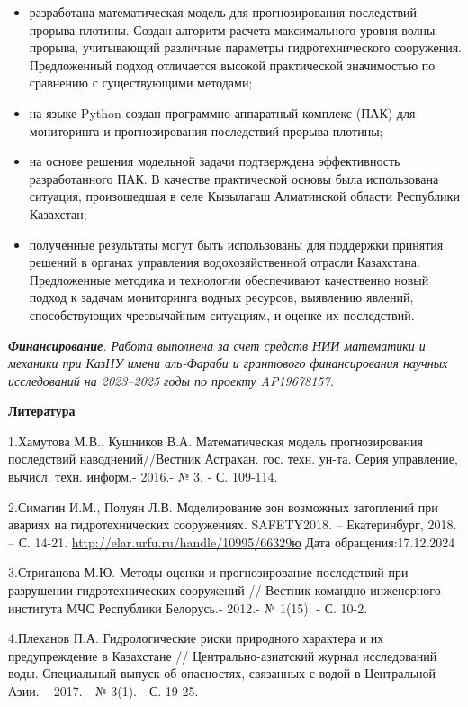{\begin{itemize}
\item
  разработана математическая модель для прогнозирования последствий
  прорыва плотины. Создан алгоритм расчета максимального уровня волны
  прорыва, учитывающий различные параметры гидротехнического сооружения.
  Предложенный подход отличается высокой практической значимостью по
  сравнению с существующими методами;
\item
  на языке Python создан программно-аппаратный комплекс (ПАК) для
  мониторинга и прогнозирования последствий прорыва плотины;
\item
  на основе решения модельной задачи подтверждена эффективность
  разработанного ПАК. В качестве практической основы была использована
  ситуация, произошедшая в селе Кызылагаш Алматинской области Республики
  Казахстан;
\item
  полученные результаты могут быть использованы для поддержки принятия
  решений в органах управления водохозяйственной отрасли Казахстана.
  Предложенные методика и технологии обеспечивают качественно новый
  подход к задачам мониторинга водных ресурсов, выявлению явлений,
  способствующих чрезвычайным ситуациям, и оценке их последствий.
\end{itemize}

\emph{{\bfseries Финансирование}. Работа выполнена за счет средств НИИ
математики и механики при КазНУ имени аль-Фараби и грантового
финансирования научных исследований на 2023--2025 годы по проекту
AP19678157.}

{\bfseries Литература}

1.Хамутова М.В., Кушников В.А. Математическая модель прогнозирования
последствий наводнений//Вестник Астрахан. гос. техн. ун-та. Серия
управление, вычисл. техн. информ.- 2016.- № 3. - С. 109-114.

2.Симагин И.М., Полуян Л.В. Моделирование зон возможных затоплений при
авариях на гидротехнических сооружениях. SAFETY2018. -- Екатеринбург,
2018. -- С. 14-21. \url{http://elar.urfu.ru/handle/10995/66329ю} Дата
обращения:17.12.2024

3.Стриганова М.Ю. Методы оценки и прогнозирование последствий при
разрушении гидротехнических сооружений // Вестник командно-инженерного
института МЧС Республики Белорусь.- 2012.- № 1(15). - С. 10-2.

4.Плеханов П.А. Гидрологические риски природного характера и их
предупреждение в Казахстане // Центрально-азиатский журнал исследований
воды. Специальный выпуск об опасностях, связанных с водой в Центральной
Азии. -- 2017. - № 3(1). - С. 19-25.

}

